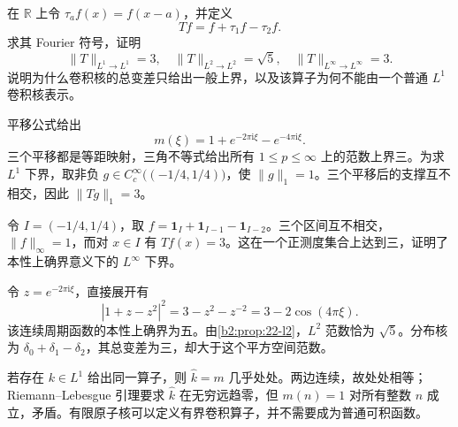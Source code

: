 \begin{exercise}\label{b2:ex:22-new-1}
在 \(\mathbb R\) 上令 \(\tau_af(x)=f(x-a)\)，并定义
\[
 Tf=f+\tau_1f-\tau_2f.
\]
求其 Fourier 符号，证明
\[
 \|T\|_{L^1\to L^1}=3,
 \quad \|T\|_{L^2\to L^2}=\sqrt5,
 \quad \|T\|_{L^\infty\to L^\infty}=3.
\]
说明为什么卷积核的总变差只给出一般上界，以及该算子为何不能由一个普通 \(L^1\) 卷积核表示。
\end{exercise}
\begin{solution}
平移公式给出
\[
 m(\xi)=1+e^{-2\pi\mathrm i\xi}-e^{-4\pi\mathrm i\xi}.
\]
三个平移都是等距映射，三角不等式给出所有 \(1\leq p\leq\infty\) 上的范数上界三。为求 \(L^1\) 下界，取非负 \(g\in C_c^\infty\bigl((-1/4,1/4)\bigr)\)，使 \(\|g\|_1=1\)。三个平移后的支撑互不相交，因此 \(\|Tg\|_1=3\)。

令 \(I=(-1/4,1/4)\)，取
\(f=\mathbf1_I+\mathbf1_{I-1}-\mathbf1_{I-2}\)。三个区间互不相交，\(\|f\|_\infty=1\)，而对 \(x\in I\) 有 \(Tf(x)=3\)。这在一个正测度集合上达到三，证明了本性上确界意义下的 \(L^\infty\) 下界。

令 \(z=e^{-2\pi\mathrm i\xi}\)，直接展开有
\[
 |1+z-z^2|^2=3-z^2-z^{-2}=3-2\cos(4\pi\xi).
\]
该连续周期函数的本性上确界为五。由\cref{b2:prop:22-l2}，\(L^2\) 范数恰为 \(\sqrt5\)。分布核为 \(\delta_0+\delta_1-\delta_2\)，其总变差为三，却大于这个平方空间范数。

若存在 \(k\in L^1\) 给出同一算子，则 \(\widehat k=m\) 几乎处处。两边连续，故处处相等；Riemann--Lebesgue 引理要求 \(\widehat k\) 在无穷远趋零，但 \(m(n)=1\) 对所有整数 \(n\) 成立，矛盾。有限原子核可以定义有界卷积算子，并不需要成为普通可积函数。
\end{solution}


